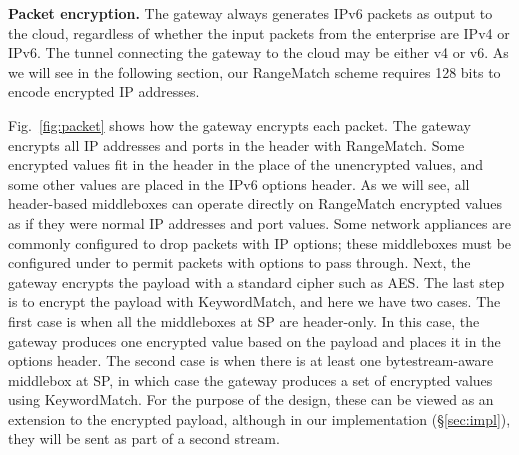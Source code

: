 
\smallskip
\noindent\textbf{Packet encryption.}
The gateway always generates IPv6 packets as output to the cloud, regardless of whether the input packets from the enterprise are IPv4 or IPv6. The tunnel connecting the gateway to the cloud may be either v4 or v6.
As we will see in the following section, our RangeMatch scheme requires 128 bits to encode encrypted IP addresses.

Fig.~\ref{fig:packet} shows how the gateway encrypts each packet. 
The gateway encrypts all IP addresses and ports in the header with RangeMatch.
Some encrypted values fit 
in the header in the place of the unencrypted values, and
some other values are placed in the IPv6 options header. 
As we will see, all header-based middleboxes can operate directly on RangeMatch encrypted values as if they were normal IP addresses and port values.
Some network appliances are commonly configured to drop packets with IP options; these middleboxes must be configured under \sys to permit packets with \sys options to pass through.
Next, the gateway encrypts the payload  with a standard cipher such as AES.
The last step is to encrypt the payload with KeywordMatch, and here we have two cases.
The first case is when all the middleboxes at SP are header-only. In this case, the gateway produces one encrypted value based on the payload and places it in the options header. The second case is when there is at least one bytestream-aware middlebox at SP, in which case the gateway produces a set of encrypted values using KeywordMatch. For the purpose of the design, these can be viewed as an extension to the encrypted payload, although in our implementation (\S\ref{sec:impl}), they will be sent as part of a second stream.





